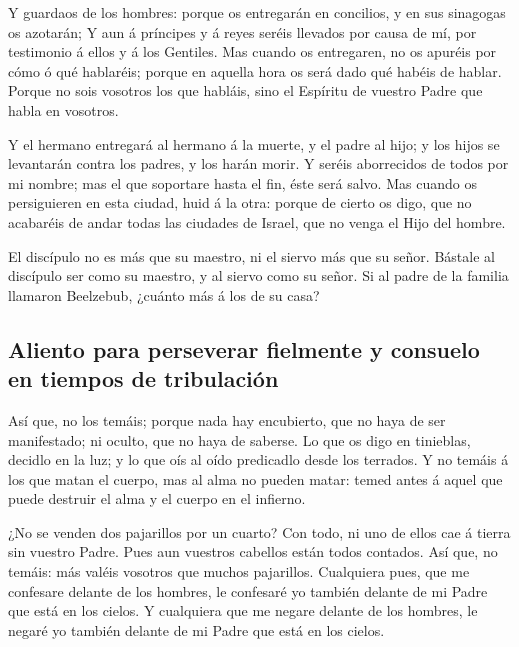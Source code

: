  Y guardaos de los hombres: porque os entregarán en
concilios, y en sus sinagogas os azotarán;  Y aun á
príncipes y á reyes seréis llevados por causa de mí, por testimonio á
ellos y á los Gentiles.  Mas cuando os entregaren, no os
apuréis por cómo ó qué hablaréis; porque en aquella hora os será dado
qué habéis de hablar.  Porque no sois vosotros los que
habláis, sino el Espíritu de vuestro Padre que habla en vosotros.

 Y el hermano entregará al hermano á la muerte, y el padre
al hijo; y los hijos se levantarán contra los padres, y los harán morir.
 Y seréis aborrecidos de todos por mi nombre; mas el que
soportare hasta el fin, éste será salvo.  Mas cuando os
persiguieren en esta ciudad, huid á la otra: porque de cierto os digo,
que no acabaréis de andar todas las ciudades de Israel, que no venga el
Hijo del hombre.

 El discípulo no es más que su maestro, ni el siervo más
que su señor.  Bástale al discípulo ser como su maestro, y
al siervo como su señor. Si al padre de la familia llamaron Beelzebub,
¿cuánto más á los de su casa?

\hypertarget{aliento-para-perseverar-fielmente-y-consuelo-en-tiempos-de-tribulaciuxf3n}{%
\subsection{Aliento para perseverar fielmente y consuelo en tiempos de
tribulación}\label{aliento-para-perseverar-fielmente-y-consuelo-en-tiempos-de-tribulaciuxf3n}}

 Así que, no los temáis; porque nada hay encubierto, que no
haya de ser manifestado; ni oculto, que no haya de saberse.
 Lo que os digo en tinieblas, decidlo en la luz; y lo que
oís al oído predicadlo desde los terrados.  Y no temáis á
los que matan el cuerpo, mas al alma no pueden matar: temed antes á
aquel que puede destruir el alma y el cuerpo en el infierno.

 ¿No se venden dos pajarillos por un cuarto? Con todo, ni
uno de ellos cae á tierra sin vuestro Padre.  Pues aun
vuestros cabellos están todos contados.  Así que, no
temáis: más valéis vosotros que muchos pajarillos. 
Cualquiera pues, que me confesare delante de los hombres, le confesaré
yo también delante de mi Padre que está en los cielos.  Y
cualquiera que me negare delante de los hombres, le negaré yo también
delante de mi Padre que está en los cielos.

